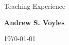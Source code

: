 \documentclass{resume2} %
\begin{document}

\begin{center}
{\Large Teaching Experience}

{\large \textbf{Andrew S. Voyles}}

\today
\end{center} 

\end{document}
